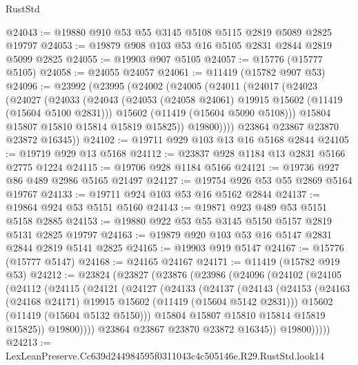\begin{lexlean}{RustStd}
\begin{coremodule}
@24043 := @19880 @910 @53 @55 @3145 @5108 @5115 @2819 @5089 @2825 @19797
@24053 := @19879 @908 @103 @53 @16 @5105 @2831 @2844 @2819 @5099 @2825
@24055 := @19903 @907 @5105
@24057 := @15776 (@15777 @5105)
@24058 := @24055 @24057
@24061 := @11419 (@15782 @907 @53)
@24096 := @23992
    (@23995
      (@24002
        (@24005
          (@24011
            (@24017
              (@24023
                (@24027
                  (@24033
                    (@24043
                      (@24053 (@24058 @24061) @19915 @15602 (@11419 (@15604 @5100 @2831)))
                      @15602
                      (@11419 (@15604 @5090 @5108)))
                    @15804
                    @15807
                    @15810
                    @15814
                    @15819
                    @15825))
                @19800))))
        @23864
        @23867
        @23870
        @23872
        @16345))
@24102 := @19711 @929 @103 @13 @16 @5168 @2844
@24105 := @19719 @929 @13 @5168
@24112 := @23837 @928 @1184 @13 @2831 @5166 @2775 @1224
@24115 := @19706 @928 @1184 @5166
@24121 := @19736 @927 @86 @489 @2986 @5165 @21497
@24127 := @19754 @926 @53 @55 @2869 @5164 @19767
@24133 := @19711 @924 @103 @53 @16 @5162 @2844
@24137 := @19864 @924 @53 @5151 @5160
@24143 := @19871 @923 @489 @53 @5151 @5158 @2885
@24153 := @19880 @922 @53 @55 @3145 @5150 @5157 @2819 @5131 @2825 @19797
@24163 := @19879 @920 @103 @53 @16 @5147 @2831 @2844 @2819 @5141 @2825
@24165 := @19903 @919 @5147
@24167 := @15776 (@15777 @5147)
@24168 := @24165 @24167
@24171 := @11419 (@15782 @919 @53)
@24212 := @23824
    (@23827
      (@23876
        (@23986
          (@24096
            (@24102
              (@24105
                (@24112
                  (@24115
                    (@24121
                      (@24127
                        (@24133
                          (@24137
                            (@24143
                              (@24153
                                (@24163 (@24168 @24171) @19915 @15602 (@11419 (@15604 @5142 @2831)))
                                @15602
                                (@11419 (@15604 @5132 @5150)))
                              @15804
                              @15807
                              @15810
                              @15814
                              @15819
                              @15825))
                          @19800))))
                  @23864
                  @23867
                  @23870
                  @23872
                  @16345))
              @19800)))))
@24213 := LexLeanPreserve.Cc639d244984595f0311043c4c505146e.R29.RustStd.look14

\end{coremodule}
\end{lexlean}
